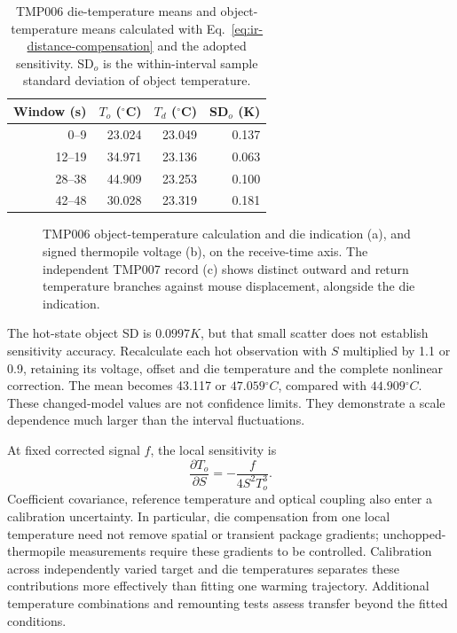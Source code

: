 \begin{table}[t]
\caption{TMP006 die-temperature means and object-temperature means calculated with Eq.~\eqref{eq:ir-distance-compensation} and the adopted sensitivity. SD$_o$ is the within-interval sample standard deviation of object temperature.}
\label{tab:ir-distance-tmp006}
\centering\small
\begin{tabular}{@{}rrrr@{}}
\toprule
Window (s) & $T_o$ ($^\circ$C) & $T_d$ ($^\circ$C) & SD$_o$ (K)\\
\midrule
0--9 & 23.024 & 23.049 & 0.137\\
12--19 & 34.971 & 23.136 & 0.063\\
28--38 & 44.909 & 23.253 & 0.100\\
42--48 & 30.028 & 23.319 & 0.181\\
\bottomrule
\end{tabular}
\end{table}

\begin{figure}[t]
\centering
\caption{TMP006 object-temperature calculation and die indication (a), and signed thermopile voltage (b), on the receive-time axis. The independent TMP007 record (c) shows distinct outward and return temperature branches against mouse displacement, alongside the die indication.}
\label{fig:ir-distance-examples}
\end{figure}

The hot-state object SD is $0.0997\unit{K}$, but that small scatter does not establish sensitivity accuracy. Recalculate each hot observation with $S$ multiplied by 1.1 or 0.9, retaining its voltage, offset and die temperature and the complete nonlinear correction. The mean becomes 43.117 or $47.059\unit{^\circ C}$, compared with $44.909\unit{^\circ C}$. These changed-model values are not confidence limits. They demonstrate a scale dependence much larger than the interval fluctuations.

At fixed corrected signal $f$, the local sensitivity is
\begin{equation}
 \frac{\partial T_o}{\partial S}=-\frac{f}{4S^2T_o^3}.
 \label{eq:ir-distance-sensitivity}
\end{equation}
Coefficient covariance, reference temperature and optical coupling also enter a calibration uncertainty. In particular, die compensation from one local temperature need not remove spatial or transient package gradients; unchopped-thermopile measurements require these gradients to be controlled\cite{sebastian2011}. Calibration across independently varied target and die temperatures separates these contributions more effectively than fitting one warming trajectory. Additional temperature combinations and remounting tests assess transfer beyond the fitted conditions.

